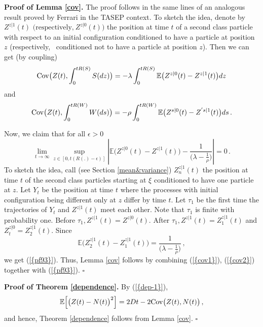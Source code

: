 \documentclass[reqno, 12pt]{amsart}
\begin{document}
{{\noindent \bf Proof of {Lemma \ref{cov}}.}} The proof follows in the same lines of an analogous result
proved by Ferrari \cite{ff} in the TASEP context. To sketch the idea,
denote by $Z^{z|1}(t)$ $\big(\mbox{respectively,} \ Z^{z|0}(t)\big)$ the
position at time $t$ of a second class particle with respect to an initial
configuration conditioned to have a particle at position $z$
(\mbox{respectively,} \ conditioned not to have a particle at position
$z$). Then we can get (by coupling)
\begin{equation} \label{cov1}
{{\rm Cov}} \big(Z(t),\int_0^{tR(S) }S(dz)\big) = -\lambda \int_0^{tR(S) } {{\mathbb E}}
\big(Z^{z|0}(t) - Z^{z|1}(t)\big)dz
\end{equation}
and
\begin{equation} \label{cov2}
{{\rm Cov}} \big(Z(t),\int_0^{tR(W)}W(ds)\big) = -\rho \int_0^{tR(W)} {{\mathbb E}}
\big(Z^{s|0}(t) - Z^{'s|1}(t)\big)ds \,.
\end{equation}

Now, we claim that for all $\epsilon > 0$
\begin{equation} \label{pf93} \lim_{t \rightarrow \infty} \sup_{z \in [0,t(R(.)
    - \epsilon )]} |{{\mathbb E}} \big(Z^{z|0}(t) - Z^{z|1}(t)\big) -
  \frac{1}{\big(\lambda - \frac{1}{\rho}\big)} |=0 \,.
\end{equation}
To sketch the idea, call (see Section \ref{mean&variance}) $Z_n^{z|1}(t)$ the position at time $t$ of the
second class particles starting at $\xi$ conditioned to have one particle at $z$.
Let $Y_t$ be the position at time $t$ where the processes with initial
configuration being different only at $z$ differ by time $t$. Let $\tau_1$ be the first time the trajectories of $Y_t$ and $Z^{z|1}(t)$ meet each other. Note that $\tau_1$ is finite with probability
one. Before $\tau_1, Z^{z|1}(t) = Z^{z|0}(t)$. After
$\tau_1,Z^{z|1}(t)=Z^{z|1}_1(t)$ and $Z^{z|0}_t=Z^{z|1}_{2}(t)$. Since
$$
{{\mathbb E}}
\big(Z^{z|1}_2(t) - Z^{z|1}_{1}(t)\big)=\frac{1}{\big(\lambda -
  \frac{1}{\rho}\big)} \,,
$$
we get {(\ref{{pf93}})}. Thus, Lemma \ref{cov} follows by combining {(\ref{{cov1}})},
{(\ref{{cov2}})} together with {(\ref{{pf93}})}.
{$\square$ \vskip 2mm}

{{\noindent \bf Proof of {Theorem \ref{dependence}}.}}
By {(\ref{{dep-1}})},
$$
{{\mathbb E}}\Big[\big(Z(t)-N(t)\big)^2\Big]=2Dt-2{{\rm Cov}} \big(Z(t),N(t)\big)\,,
$$
and hence, Theorem \ref{dependence} follows from Lemma \ref{cov}. {$\square$ \vskip 2mm}
\end{document}
